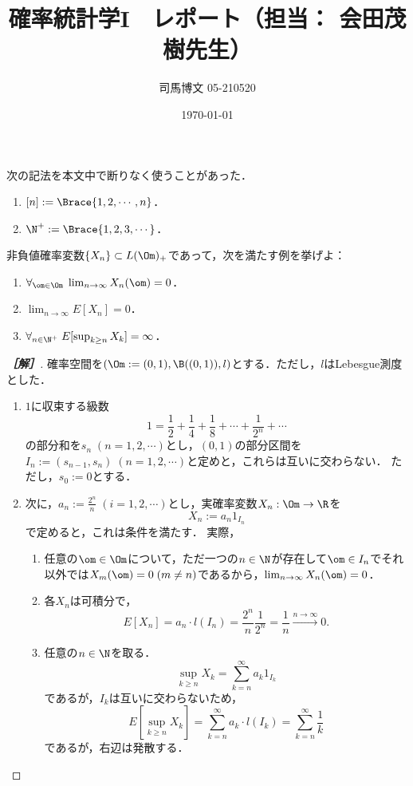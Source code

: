 \documentclass[uplatex,dvipdfmx]{jsarticle}
\title{確率統計学I　レポート（担当： 会田茂樹先生）}
\author{司馬博文 05-210520}
\date{\today}
\begin{document}
\begin{notation*}
    次の記法を本文中で断りなく使うことがあった．
    \begin{enumerate}
        \item $[n]:=\Brace{1,2,\cdots,n}$．
        \item $\N^+:=\Brace{1,2,3,\cdots}$．
    \end{enumerate}
\end{notation*}

\begin{problem*}[2]
    非負値確率変数$\{X_n\}\subset L(\Om)_+$であって，次を満たす例を挙げよ：
    \begin{enumerate}
        \item $\forall_{\om\in\Om}\;\lim_{n\to\infty}X_n(\om)=0$．
        \item $\lim_{n\to\infty}E[X_n]=0$．
        \item $\forall_{n\in\N^+}\;E[\sup_{k\ge n}X_k]=\infty$．
    \end{enumerate}
\end{problem*}
\begin{proof}[\bf［解］]
    確率空間を$(\Om:=(0,1),\B((0,1)),l)$とする．ただし，$l$はLebesgue測度とした．
    \begin{enumerate}[{第}1{段}]
        \item $1$に収束する級数
        \[1=\frac{1}{2}+\frac{1}{4}+\frac{1}{8}+\cdots+\frac{1}{2^n}+\cdots\]
        の部分和を$s_n\;(n=1,2,\cdots)$とし，$(0,1)$の部分区間を
        $I_n:=(s_{n-1},s_{n})\;(n=1,2,\cdots)$と定めと，これらは互いに交わらない．
        ただし，$s_0:=0$とする．
        \item 次に，$a_n:=\frac{2^n}{n}\;(i=1,2,\cdots)$とし，実確率変数$X_n:\Om\to\R$を
        \[X_n:=a_n1_{I_n}\]
        で定めると，これは条件を満たす．
        実際，
        \begin{enumerate}[(1)]
            \item 任意の$\om\in\Om$について，ただ一つの$n\in\N$が存在して$\om\in I_n$でそれ以外では$X_m(\om)=0\;(m\ne n)$であるから，$\lim_{n\to\infty}X_n(\om)=0$．
            \item 各$X_n$は可積分で，
            \[E[X_n]=a_n\cdot l(I_n)=\frac{2^n}{n}\frac{1}{2^n}=\frac{1}{n}\xrightarrow{n\to\infty}0.\]
            \item 任意の$n\in\N$を取る．
            \[\sup_{k\ge n}X_k=\sum_{k=n}^\infty a_k1_{I_k}\]
            であるが，$I_k$は互いに交わらないため，
            \[E[\sup_{k\ge n}X_k]=\sum_{k=n}^\infty a_k\cdot l(I_k)=\sum_{k=n}^\infty\frac{1}{k}\]
            であるが，右辺は発散する．
        \end{enumerate}
    \end{enumerate}
\end{proof}
\end{document}
